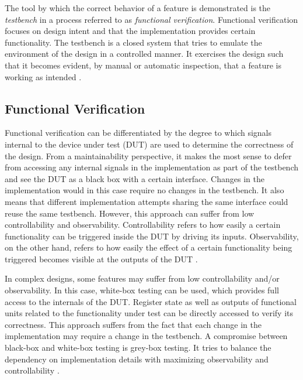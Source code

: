 The tool by which the correct behavior of a feature is demonstrated is the \textit{testbench} in a process referred to as
\textit{functional verification}. Functional verification focuses on design intent and that the implementation
provides certain functionality. The testbench is a closed system that tries to emulate the environment of the design
in a controlled manner. It exercises the design such that it becomes evident, by manual or automatic inspection, that
a feature is working as intended \cite[Ch. 1]{bergeron2012writing}.

\subsection{Functional Verification} %

Functional verification can be differentiated by the degree to which signals internal to the device under
test (DUT) are used to determine the correctness of the design. From a maintainability perspective, it makes
the most sense to defer from accessing any internal signals in the implementation as part of the testbench and see the
DUT as a black box with a certain interface. Changes in the implementation would in this case require no changes in
the testbench. It also means that different implementation attempts sharing the same interface could reuse the same
testbench. However, this approach can suffer from low controllability and observability. Controllability refers to
how easily a certain functionality can be triggered inside the DUT by driving its inputs. Observability, on the other
hand, refers to how easily the effect of a certain functionality being triggered becomes visible at the outputs of
the DUT \cite[Ch. 1]{bergeron2012writing}.

In complex designs, some features may suffer from low controllability and/or observability. In this case, white-box
testing can be used, which provides full access to the internals of the DUT. Register state as well as outputs of
functional units related to the functionality under test can be directly accessed to verify its correctness. This
approach suffers from the fact that each change in the implementation may require a change in the testbench. A
compromise between black-box and white-box testing is grey-box testing. It tries to balance the dependency on
implementation details with maximizing observability and controllability \cite[Ch. 1]{bergeron2012writing}.

